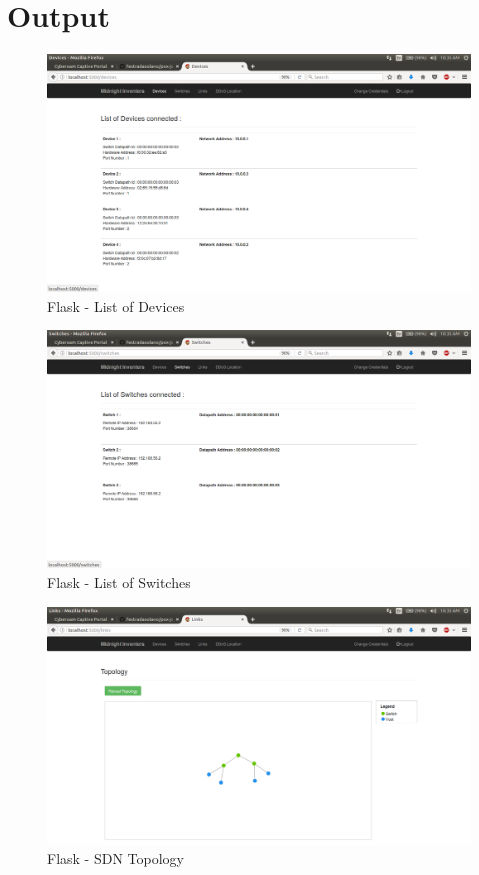 \documentclass[12pt,a4paper,final]{report}
\begin{document}
\newpage

\section{Output}

\begin{figure}[h]
\centering
\includegraphics[scale=0.3]{devices.png}
\caption{Flask - List of Devices}
\end{figure}

\begin{figure}[h]
\centering
\includegraphics[scale=0.3]{switches.png}
\caption{Flask - List of Switches}
\end{figure}

\newpage

\begin{figure}[h]
\centering
\includegraphics[scale=0.3]{flask.png}
\caption{Flask - SDN Topology}
\end{figure}
\end{document}
